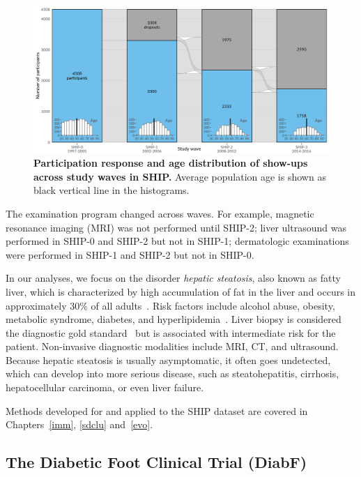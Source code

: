\documentclass[
  oneside]{book}
\begin{document}
\begin{figure}[htbp]

{\centering \includegraphics[width=1\linewidth]{figures/02-ship-sankey} 

}

\caption{\textbf{Participation response and age distribution of show-ups across study waves in SHIP.} Average population age is shown as black vertical line in the histograms.}\label{fig:02-ship-sankey}
\end{figure}

The examination program changed across waves.
For example, magnetic resonance imaging (MRI) was not performed until SHIP-2; liver ultrasound was performed in SHIP-0 and SHIP-2 but not in SHIP-1; dermatologic examinations were performed in SHIP-1 and SHIP-2 but not in SHIP-0.

In our analyses, we focus on the disorder \emph{hepatic steatosis}, also known as fatty liver, which is characterized by high accumulation of fat in the liver and occurs in approximately 30\% of all adults~\autocite{Voelzke:SHIP11,volzke2005hepatic}.
Risk factors include alcohol abuse, obesity, metabolic syndrome, diabetes, and hyperlipidemia~\autocite{antunes2019fatty}.
Liver biopsy is considered the diagnostic gold standard~\autocite{antunes2019fatty} but is associated with intermediate risk for the patient.
Non-invasive diagnostic modalities include MRI, CT, and ultrasound.
Because hepatic steatosis is usually asymptomatic, it often goes undetected, which can develop into more serious disease, such as steatohepatitis, cirrhosis, hepatocellular carcinoma, or even liver failure.

Methods developed for and applied to the SHIP dataset are covered in Chapters~\ref{imm}, \ref{sdclu} and~\ref{evo}.

\hypertarget{background-data-diabf}{%
\subsection{The Diabetic Foot Clinical Trial (DiabF)}\label{background-data-diabf}}
\end{document}

